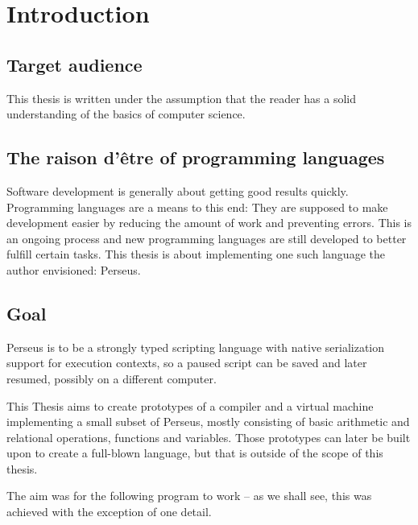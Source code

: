 
\chapter{Introduction}

    
    \section{Target audience}
    This thesis is written under the assumption that the reader has a solid understanding of the basics of computer science.
    
	\section{The raison d'être of programming languages}
	
	Software development is generally about getting good results quickly. Programming languages are a means to this end: They are supposed to make development easier by reducing the amount of work and preventing errors. This is an ongoing process and new programming languages are still developed to better fulfill certain tasks. This thesis is about implementing one such language the author envisioned: Perseus.

	\section{Goal} %
	
	Perseus is to be a strongly typed scripting language with native serialization support for execution contexts, so a paused script can be saved and later resumed, possibly on a different computer.
	
	This Thesis aims to create prototypes of a compiler and a virtual machine implementing a small subset of Perseus, mostly consisting of basic arithmetic and relational operations, functions and variables. Those prototypes can later be built upon to create a full-blown language, but that is outside of the scope of this thesis.
	
	The aim was for the following program to work -- as we shall see, this was achieved with the exception of one detail.
	
